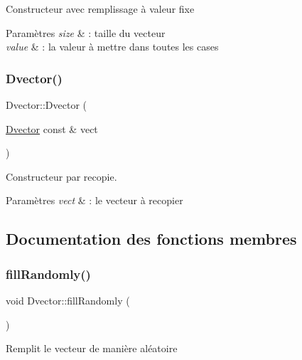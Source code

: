 Constructeur avec remplissage à valeur fixe 
\begin{DoxyParams}{Paramètres}
{\em size} & \+: taille du vecteur \\
\hline
{\em value} & \+: la valeur à mettre dans toutes les cases \\
\hline
\end{DoxyParams}
\mbox{\label{class_dvector_aa3a4f95e9bfe8139537593f86640d3af}} 
\subsubsection{\texorpdfstring{Dvector()}{Dvector()}\hspace{0.1cm}{\footnotesize\ttfamily [2/2]}}
{\footnotesize\ttfamily Dvector\+::\+Dvector (\begin{DoxyParamCaption}\item[{\hyperlink{class_dvector}{Dvector} const \&}]{vect }\end{DoxyParamCaption})}



Constructeur par recopie. 


\begin{DoxyParams}{Paramètres}
{\em vect} & \+: le vecteur à recopier \\
\hline
\end{DoxyParams}


\subsection{Documentation des fonctions membres}
\mbox{\label{class_dvector_a6fecdca0fbad7f928403597e322234b1}} 
\subsubsection{\texorpdfstring{fill\+Randomly()}{fillRandomly()}}
{\footnotesize\ttfamily void Dvector\+::fill\+Randomly (\begin{DoxyParamCaption}{ }\end{DoxyParamCaption})}

Remplit le vecteur de manière aléatoire \mbox{\label{class_dvector_a237ba8b1ca7e68f78ec3f85ae800cbec}} 
